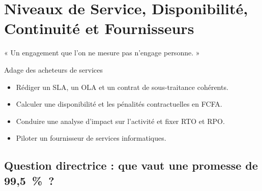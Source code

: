 
\chapter{Niveaux de Service, Disponibilité, Continuité et Fournisseurs}
\label{chap:itil-niveaux}

\epigraph{%
    « Un engagement que l'on ne mesure pas n'engage personne. »%
}{Adage des acheteurs de services}


\begin{boxobjectifs}
\begin{itemize}
    \item Rédiger un SLA, un OLA et un contrat de sous-traitance cohérents.
    \item Calculer une disponibilité et les pénalités contractuelles en
          FCFA.
    \item Conduire une analyse d'impact sur l'activité et fixer RTO et RPO.
    \item Piloter un fournisseur de services informatiques.
\end{itemize}
\end{boxobjectifs}

\bigskip

\section*{Question directrice : que vaut une promesse de 99,5~\%~?}


